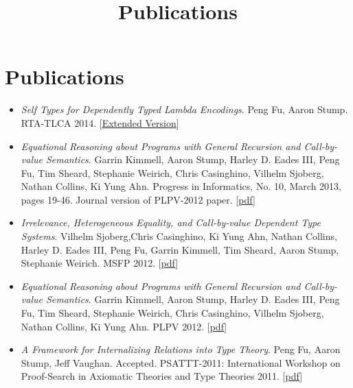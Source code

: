 \documentclass[10pt]{article}
\title{\bfseries\Large Publications}
\date{}
\begin{document}
\maketitle
\vspace{-4em}

\vspace{20pt}





\section*{Publications}

\begin{itemize}
\item \textit{Self Types for Dependently Typed Lambda Encodings}. Peng Fu, Aaron Stump. RTA-TLCA 2014. [\href{../../document/papers/rta-tlca.pdf}{Extended Version}]
\item \textit{Equational Reasoning about Programs with General Recursion and Call-by-value Semantics}. Garrin Kimmell, Aaron Stump, Harley D. Eades III, Peng Fu, Tim Sheard, Stephanie Weirich, Chris Casinghino, Vilhelm Sjoberg, Nathan Collins, Ki Yung Ahn. Progress in Informatics, No. 10, March 2013, pages 19-46. Journal version of PLPV-2012 paper. [\href{../../document/papers/pi13.pdf}{pdf}] 
\item \textit{Irrelevance, Heterogeneous Equality, and Call-by-value Dependent Type Systems}. Vilhelm Sjoberg,Chris Casinghino, Ki Yung Ahn, Nathan Collins, Harley D. Eades III, Peng Fu, Garrin Kimmell, Tim Sheard, Aaron Stump, Stephanie Weirich. MSFP 2012. [\href{../../document/papers/msfp12.pdf}{pdf}] 
\item \textit{Equational Reasoning about Programs with General Recursion and Call-by-value Semantics}. Garrin Kimmell, Aaron Stump, Harley D. Eades III, Peng Fu, Tim Sheard, Stephanie Weirich, Chris Casinghino, Vilhelm Sjoberg, Nathan Collins, Ki Yung Ahn. PLPV 2012. [\href{../../document/papers/plpv12.pdf}{pdf}] 

\item \textit{A Framework for Internalizing Relations into Type Theory}. Peng Fu, Aaron Stump, Jeff Vaughan. Accepted. PSATTT-2011: International Workshop on Proof-Search in Axiomatic Theories and Type Theories 2011. [\href{../../document/papers/psattt-paper.pdf}{pdf}]
  
\end{itemize}
\end{document}
